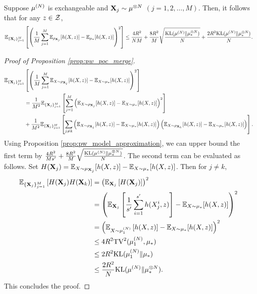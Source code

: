 \begin{proposition}\label{prop:pw_poc_merge}
    Suppose $\pow[\mu,N]$ is exchangeable and $\vX_{j} \sim \tensor[\mu,N]$ $(j=1,2,\ldots,M)$. Then, it follows that for any $z \in \mathcal{Z}$,
    \begin{align*} 
        \bE_{\{\vX_j\}_{j=1}^M}\left[ \left( \frac{1}{M}\sum_{j=1}^M\bE_{\rho_{\vX_j}}[ h(X,z)] - \bE_{\mu_*}[h(X,z)]\right)^2 \right] 
        \leq \frac{4R^2}{N M} + \frac{8R^2}{M}\sqrt{ \frac{\KL(\pow[\mu,N]\|\tensor[\mu_*,N])}{N}} 
    + \frac{2R^2 \KL(\pow[\mu,N] \| \tensor[\mu,N]_*)}{N}.
    \end{align*}
\end{proposition}
\begin{proof}[Proof of Proposition \ref{prop:pw_poc_merge}]
    \begin{align*}
        \mathbb{E}_{\{\mathbf{X}_j\}_{j=1}^M}&\left[ \left( \frac{1}{M}\sum_{j=1}^M\mathbb{E}_{X \sim \rho_{\mathbf{X}_j}}[ h(X,z)] - \mathbb{E}_{X\sim\mu_*}[h(X,z)]\right)^2 \right] \\
        &= \frac{1}{M^2}\mathbb{E}_{\{\mathbf{X}_j\}_{j=1}^M}\left[ \sum_{j=1}^M\left(\mathbb{E}_{X \sim \rho_{\mathbf{X}_j}}[ h(X,z)] - \mathbb{E}_{X\sim\mu_*}[h(X,z)]\right)^2 \right] \\
        &+ \frac{1}{M^2}\mathbb{E}_{\{\mathbf{X}_j\}_{j=1}^M}\left[ \sum_{j\neq k}\left( \mathbb{E}_{X \sim \rho_{\mathbf{X}_j}}[ h(X,z)] - \mathbb{E}_{X\sim\mu_*}[h(X,z)]\right)\left( \mathbb{E}_{X \sim \rho_{\mathbf{X}_k}}[ h(X,z)] - \mathbb{E}_{X\sim\mu_*}[h(X,z)]\right) \right].
    \end{align*}
    Using Proposition \ref{prop:pw_model_approximation}, we can upper bound the first term by $\frac{4R^2}{Ms'} + \frac{8R^2}{M}\sqrt{ \frac{\KL(\pow[\mu,N]\|\tensor[\mu_*,N])}{N}}$. 
    The second term can be evaluated as follows. Set $H(\mathbf{X}_j) = \mathbb{E}_{X \sim \mu_{\mathbf{X}_j}}[ h(X,z)] - \mathbb{E}_{X\sim\mu_*}[h(X,z)]$. Then for $j\neq k$,
    \begin{align*}
        \bE_{\{\vX_j\}_{j=1}^M}\left[ H(\vX_j)H(\vX_k) \right]
        &= \left( \bE_{\vX_j}\left[ H(\vX_j) \right] \right)^2 \\
        &= \left( \bE_{\vX_j}\left[  \frac{1}{s'} \sum_{i=1}^{s'} h(X_j^i,z) \right] - \bE_{X\sim\mu_*}[h(X,z)] \right)^2 \\
        &= \left( \bE_{X \sim \pow[\mu,N]_1}\left[  h(X,z) \right] - \bE_{X\sim\mu_*}[h(X,z)] \right)^2 \\
        &\leq 4R^2 \TV^2(\pow[\mu,N]_1,\mu_*) \\
        &\leq 2R^2 \KL(\pow[\mu,N]_1 \| \mu_*) \\
        &\leq \frac{2R^2}{N}\KL(\pow[\mu,N] \| \tensor[\mu,N]_*).
    \end{align*}
    This concludes the proof.
\end{proof}

